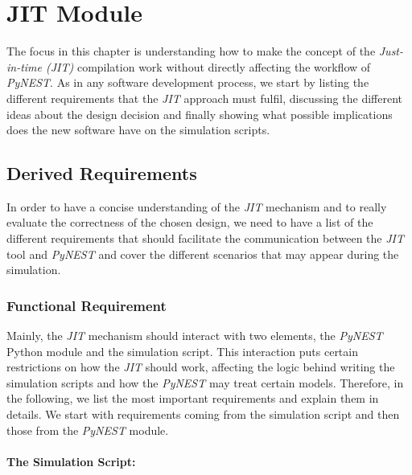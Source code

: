 
\chapter{JIT Module}
The focus in this chapter is understanding how to make the concept of the \emph{Just-in-time (JIT)} compilation work without directly affecting the workflow of \emph{PyNEST}. As in any software development process, we start by listing the different requirements that the \emph{JIT} approach must fulfil, discussing the different ideas about the design decision and finally showing what possible implications does the new software have on the simulation scripts.

 \label{chap:jit}
\section{Derived Requirements}
In order to have a concise understanding of the \emph{JIT} mechanism and to really evaluate the correctness of the chosen design, we need to have a list of the different requirements that should facilitate the communication between  the \emph{JIT} tool and \emph{PyNEST} and cover the different scenarios that may appear during the simulation. 
\subsection{Functional Requirement}



Mainly, the \emph{JIT} mechanism should interact with two elements, the \emph{PyNEST} Python module and the simulation script. This interaction puts certain restrictions on how the \emph{JIT} should work, affecting the logic behind writing the simulation scripts and how the \emph{PyNEST} may treat certain models. Therefore, in the following, we list the most important requirements and explain them in details. We start with requirements coming from the simulation script and then those from the \emph{PyNEST} module.

\subsubsection*{The Simulation Script:}

